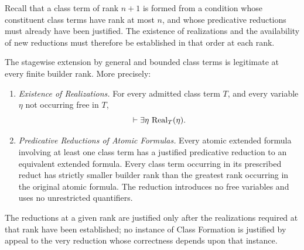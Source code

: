 
Recall that a class term of rank \(n+1\) is formed from a condition
whose constituent class terms have rank at most \(n\), and whose
predicative reductions must already have been justified. The
existence of realizations and the availability of new reductions
must therefore be established in that order at each rank.

\begin{metatheorem}
\label{meta:class-term-extension}
The stagewise extension by general and bounded class terms is
legitimate at every finite builder rank. More precisely:
\begin{enumerate}
\item \emph{Existence of Realizations.}
For every admitted class term \(T\), and every variable \(\eta\)
not occurring free in \(T\),
\[
\vdash\exists\eta\,\operatorname{Real}_T(\eta).
\]

\item \emph{Predicative Reductions of Atomic Formulas.}
Every atomic extended formula involving at least one class term has
a justified predicative reduction to an equivalent extended formula.
Every class term occurring in its prescribed reduct has strictly
smaller builder rank than the greatest rank occurring in the
original atomic formula. The reduction introduces no free variables
and uses no unrestricted quantifiers.
\end{enumerate}
The reductions at a given rank are justified only after the
realizations required at that rank have been established; no instance
of Class Formation is justified by appeal to the very reduction whose
correctness depends upon that instance.
\end{metatheorem}

